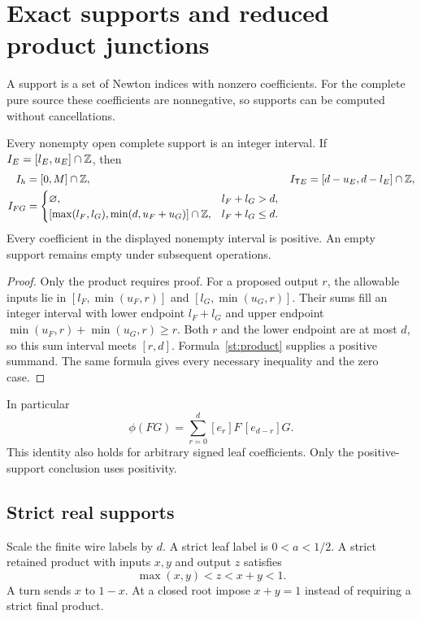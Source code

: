 \section{Exact supports and reduced product junctions}\label{st:syntax}
A support is a set of Newton indices with nonzero coefficients.
For the complete pure source these coefficients are nonnegative,
so supports can be computed without cancellations.

\begin{proposition}\label{st:finite-support}
Every nonempty open complete support is an integer interval. If
$I_E=[l_E,u_E]\cap\mathbb Z$, then
\begin{align}
 I_h&=[0,M]\cap\mathbb Z,&
 I_{\mathsf T E}&=[d-u_E,d-l_E]\cap\mathbb Z,\notag\\
 I_{FG}&=
 \begin{cases}
 \varnothing,&l_F+l_G>d,\\
 [\max(l_F,l_G),\min(d,u_F+u_G)]\cap\mathbb Z,&l_F+l_G\le d.
 \end{cases}\label{st:interval}
\end{align}
Every coefficient in the displayed nonempty interval is positive.
An empty support remains empty under subsequent operations.
\end{proposition}
\begin{proof}
Only the product requires proof. For a proposed output $r$, the
allowable inputs lie in
$[l_F,\min(u_F,r)]$ and $[l_G,\min(u_G,r)]$.
Their sums fill an integer interval with lower endpoint $l_F+l_G$
and upper endpoint $\min(u_F,r)+\min(u_G,r)\ge r$.
Both $r$ and the lower endpoint are at most $d$, so this sum
interval meets $[r,d]$. Formula~\eqref{st:product} supplies a
positive summand. The same formula gives every necessary
inequality and the zero case.
\end{proof}
In particular
\[
 \phi(FG)=\sum_{r=0}^d [e_r]F\,[e_{d-r}]G.
\]
This identity also holds for arbitrary signed leaf coefficients.
Only the positive-support conclusion uses positivity.

\subsection{Strict real supports}
Scale the finite wire labels by $d$. A strict leaf label is
$0<a<1/2$. A strict retained product with inputs $x,y$ and output
$z$ satisfies
\begin{equation}\label{st:strict-gate}
 \max(x,y)<z<x+y<1.
\end{equation}
A turn sends $x$ to $1-x$. At a closed root impose $x+y=1$
instead of requiring a strict final product.

